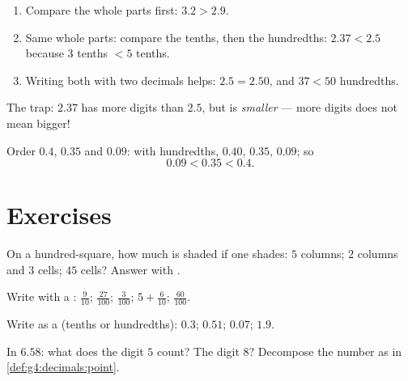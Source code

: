 \begin{method}\label{met:g4:decimals:compare}
\begin{enumerate}
  \item Compare the whole parts first: $3.2 > 2.9$.
  \item Same whole parts: compare the tenths, then the hundredths:
        $2.37 < 2.5$ because $3$ tenths $< 5$ tenths.
  \item Writing both with two decimals helps: $2.5 = 2.50$, and
        $37 < 50$ hundredths.
\end{enumerate}
The trap: $2.37$ has more digits than $2.5$, but is
\emph{smaller} --- more digits does not mean bigger!
\end{method}

\begin{example}\label{ex:g4:decimals:compare}
Order $0.4$, $0.35$ and $0.09$: with hundredths, $0.40$, $0.35$,
$0.09$; so
\[
0.09 < 0.35 < 0.4 .
\]
\end{example}

\section{Exercises}

\begin{exercise}[$\star$]\label{exo:g4:decimals:1}
On a hundred-square, how much is shaded if one shades: $5$ columns;
$2$ columns and $3$ cells; $45$ cells? Answer with .
\end{exercise}

\begin{exercise}[$\star$]\label{exo:g4:decimals:2}
Write with a :
$\frac{9}{10}$; \quad $\frac{27}{100}$; \quad $\frac{3}{100}$; \quad
$5 + \frac{6}{10}$; \quad $\frac{60}{100}$.
\end{exercise}

\begin{exercise}[$\star$]\label{exo:g4:decimals:3}
Write as a  (tenths or hundredths):
$0.3$; \quad $0.51$; \quad $0.07$; \quad $1.9$.
\end{exercise}

\begin{exercise}[$\star$]\label{exo:g4:decimals:4}
In $6.58$: what does the digit $5$ count? The digit $8$? Decompose
the number as in \cref{def:g4:decimals:point}.
\end{exercise}

